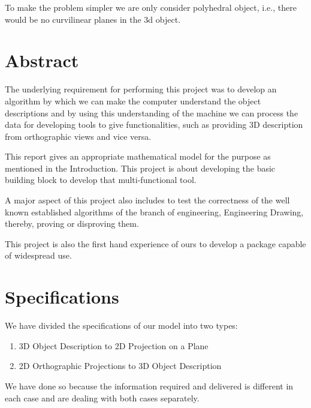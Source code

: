 \documentclass[12pt]{report}
\begin{document}
To make the problem simpler we are only consider polyhedral object, i.e., there would be no curvilinear planes in the 3d object.





\newpage
\section*{Abstract}
The underlying requirement for performing this project was to develop an algorithm by which we can make the computer understand the object descriptions and by using this understanding of the machine we can process the data for developing tools to give functionalities, such as providing 3D description from orthographic views and vice versa.

This report gives an appropriate mathematical model for the purpose as mentioned in the Introduction. This project is about developing the basic building block to develop that multi-functional tool.

A major aspect of this project also includes to test the correctness of the well known established algorithms of the branch of engineering, Engineering Drawing, thereby, proving or disproving them.

This project is also the first hand experience of ours to develop a package capable of widespread use.
\newpage
\section*{Specifications}
We have divided the specifications of our model into two types:
\begin{enumerate}
\item 3D Object Description to 2D Projection on a Plane
\item 2D Orthographic Projections to 3D Object Description
\end{enumerate}
We have done so because the information required and delivered is different in each case and are dealing with both cases separately.
\end{document}
